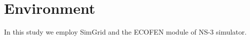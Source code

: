 \chapter{Environment}
\label{chapter:environment}
In this study we employ SimGrid and the ECOFEN module of NS-3 simulator.  